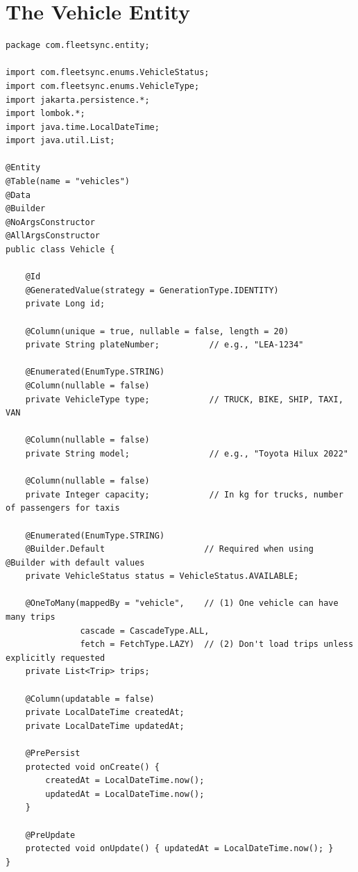 \documentclass[12pt,a4paper]{report}
\begin{document}
\section{The Vehicle Entity}

\begin{lstlisting}[caption=Vehicle.java -- The Vehicle Entity]
package com.fleetsync.entity;

import com.fleetsync.enums.VehicleStatus;
import com.fleetsync.enums.VehicleType;
import jakarta.persistence.*;
import lombok.*;
import java.time.LocalDateTime;
import java.util.List;

@Entity
@Table(name = "vehicles")
@Data
@Builder
@NoArgsConstructor
@AllArgsConstructor
public class Vehicle {

    @Id
    @GeneratedValue(strategy = GenerationType.IDENTITY)
    private Long id;

    @Column(unique = true, nullable = false, length = 20)
    private String plateNumber;          // e.g., "LEA-1234"

    @Enumerated(EnumType.STRING)
    @Column(nullable = false)
    private VehicleType type;            // TRUCK, BIKE, SHIP, TAXI, VAN

    @Column(nullable = false)
    private String model;                // e.g., "Toyota Hilux 2022"

    @Column(nullable = false)
    private Integer capacity;            // In kg for trucks, number of passengers for taxis

    @Enumerated(EnumType.STRING)
    @Builder.Default                    // Required when using @Builder with default values
    private VehicleStatus status = VehicleStatus.AVAILABLE;

    @OneToMany(mappedBy = "vehicle",    // (1) One vehicle can have many trips
               cascade = CascadeType.ALL,
               fetch = FetchType.LAZY)  // (2) Don't load trips unless explicitly requested
    private List<Trip> trips;

    @Column(updatable = false)
    private LocalDateTime createdAt;
    private LocalDateTime updatedAt;

    @PrePersist
    protected void onCreate() {
        createdAt = LocalDateTime.now();
        updatedAt = LocalDateTime.now();
    }

    @PreUpdate
    protected void onUpdate() { updatedAt = LocalDateTime.now(); }
}
\end{lstlisting}
\end{document}
